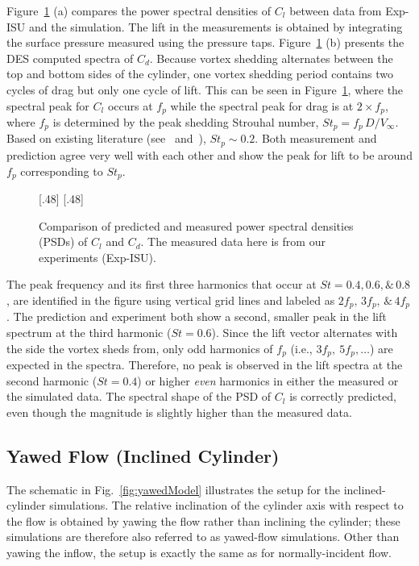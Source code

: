 Figure~\ref{fig:St_Compared_Re20k} (a) compares the power spectral densities of
$C_l$ between data from Exp-ISU and the simulation.  The lift in the
measurements is obtained by integrating the surface pressure measured using the
pressure taps. Figure~\ref{fig:St_Compared_Re20k} (b) presents the DES computed
spectra of $C_d$. Because vortex shedding alternates between the top and bottom
sides of the cylinder, one vortex shedding period contains two cycles of drag
but only one cycle of lift. This can be seen in
Figure~\ref{fig:St_Compared_Re20k}, where the spectral peak for $C_l$ occurs at
$f_p$ while the spectral peak for drag is at $2\times f_p$, where $f_p$ is
determined by the peak shedding Strouhal number, $St_p = f_p\,D/V_\infty$.
Based on existing literature (see~\cite{travin2000detached}
and~\cite{norberg2013pressure}), $St_p \sim 0.2$. Both measurement and
prediction agree very well with each other and show the peak for lift to be
around $f_p$ corresponding to $St_p$.
%
\begin{figure}[htb!]
  \centering
    [.48\linewidth]{}
  \hspace*{\fill}
    [.48\linewidth]{}
    \caption{Comparison of predicted and measured power spectral densities
      (PSDs) of $C_l$ and $C_d$. The
      measured data here is from our experiments (Exp-ISU).}
\label{fig:St_Compared_Re20k}
\end{figure}

The peak frequency and its first three harmonics that occur at $St = 0.4, 0.6,
\& \,0.8$, are identified in the figure using vertical grid lines and labeled
as $2f_p,\,3f_p,\,\&\,4f_p$. The prediction and experiment both show a second,
smaller peak in the lift spectrum at the third harmonic ($St=0.6$).  Since the
lift vector alternates with the side the vortex sheds from, only odd harmonics
of $f_p$ (i.e., $3f_p,~5f_p,\ldots$) are expected in the spectra. Therefore, no
peak is observed in the lift spectra at the second harmonic ($St=0.4$) or
higher {\em even} harmonics in either the measured or the simulated data. The
spectral shape of the PSD of $C_l$ is correctly predicted, even though the
magnitude is slightly higher than the measured data.

\subsection{Yawed Flow (Inclined Cylinder)}
\label{sec:inclined_cylinder}
%
The schematic in Fig.~\ref{fig:yawedModel} illustrates the setup for the
inclined-cylinder simulations. The relative inclination of the cylinder axis
with respect to the flow is obtained by yawing the flow rather than inclining
the cylinder; these simulations are therefore also referred to as yawed-flow
simulations. Other than yawing the inflow, the setup is exactly the same as for
normally-incident flow.

